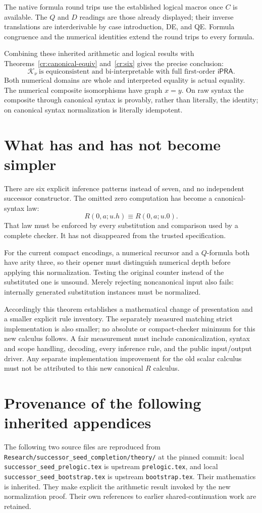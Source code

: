\documentclass[11pt]{article}
\theoremstyle{definition}\newtheorem{definition}[theorem]{Definition}
\newcommand{\Knorm}{\mathcal K_\nu}
\newcommand{\ipra}{\mathsf{iPRA}}
\newcommand{\file}[1]{{\small\nolinkurl{#1}}}
\begin{document}
The native formula round trips use the established logical macros once \(C\) is available. The \(Q\) and \(D\) readings are those already displayed; their inverse translations are interderivable by case introduction, DE, and QE. Formula congruence and the numerical identities extend the round trips to every formula.

Combining these inherited arithmetic and logical results with Theorems~\ref{cr:canonical-equiv} and~\ref{cr:six} gives the precise conclusion:
\[
\Knorm\ \text{is equiconsistent and bi-interpretable with full first-order }\ipra.
\]
Both numerical domains are whole and interpreted equality is actual equality. The numerical composite isomorphisms have graph \(x=y\). On raw syntax the composite through canonical syntax is provably, rather than literally, the identity; on canonical syntax normalization is literally idempotent.

\section{What has and has not become simpler}

There are six explicit inference patterns instead of seven, and no independent successor constructor. The omitted zero computation has become a canonical-syntax law:
\[
R(0,a;u.h)\equiv R(0,a;u.0).
\]
That law must be enforced by every substitution and comparison used by a complete checker. It has not disappeared from the trusted specification.

For the current compact encodings, a numerical recursor and a \(Q\)-formula both have arity three, so their opener must distinguish numerical depth before applying this normalization. Testing the original counter instead of the substituted one is unsound. Merely rejecting noncanonical input also fails: internally generated substitution instances must be normalized.

Accordingly this theorem establishes a mathematical change of presentation and a smaller explicit rule inventory. The separately measured matching strict implementation is also smaller; no absolute or compact-checker minimum for this new calculus follows. A fair measurement must include canonicalization, syntax and scope handling, decoding, every inference rule, and the public input/output driver. Any separate implementation improvement for the old scalar calculus must not be attributed to this new canonical \(R\) calculus.

\appendix
\section*{Provenance of the following inherited appendices}
The following two source files are reproduced from
\file{Research/successor_seed_completion/theory/}
at the pinned commit: local \file{successor_seed_prelogic.tex} is upstream
\file{prelogic.tex}, and local \file{successor_seed_bootstrap.tex} is upstream
\file{bootstrap.tex}. Their mathematics is inherited. They make explicit the arithmetic result invoked by the new normalization proof. Their own references to earlier shared-continuation work are retained.


\end{document}
